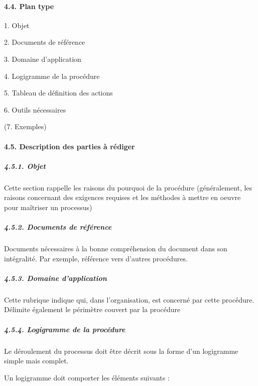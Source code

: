 \documentclass{article}
\begin{document}
\bigskip

\paragraph[4.4. Plan type]{4.4. Plan type}

\bigskip

1. Objet

2. Documents de référence

3. Domaine d’application

4. Logigramme de la procédure

5. Tableau de définition des actions

6. Outils nécessaires

(7. Exemples)


\bigskip

\paragraph[4.5. Description des parties à rédiger]{4.5. Description des
parties à rédiger}
\subparagraph[4.5.1. Objet]{4.5.1. Objet}
Cette section rappelle les raisons du pourquoi de la procédure
(généralement, les raisons concernant des exigences requises et les
méthodes à mettre en oeuvre pour maîtriser un processus)

\subparagraph[4.5.2. Documents de référence]{4.5.2. Documents de
référence}
Documents nécessaires à la bonne compréhension du document dans son
intégralité. Par exemple, référence vers d’autres procédures.

\subparagraph[4.5.3. Domaine d’application]{4.5.3. Domaine
d’application}
Cette rubrique indique qui, dans l’organisation, est concerné par cette
procédure. Délimite également le périmètre couvert par la procédure

\subparagraph[4.5.4. Logigramme de la procédure]{4.5.4. Logigramme de la
procédure}
Le déroulement du processus doit être décrit sous la forme d’un
logigramme simple mais complet. 


\bigskip

Un logigramme doit comporter les éléments suivants :


\bigskip
\end{document}
